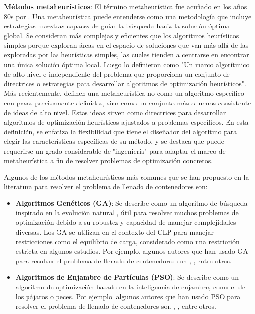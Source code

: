 \documentclass[openany]{article}
\begin{document}
\textbf{Métodos metaheurísticos}: El término metaheurística fue acuñado en los años 80s por \textcite{GLOVER1986533}. Una metaheurística puede entenderse como una metodología que incluye estrategias maestras capaces de guiar la búsqueda hacia la solución óptima global. Se consideran más complejas y eficientes que los algoritmos heurísticos simples porque exploran áreas en el espacio de soluciones que van más allá de las exploradas por las heurísticas simples, las cuales tienden a centrarse en encontrar una única solución óptima local. Luego \textcite{Sorensen2013} lo definieron como "Un marco algorítmico de alto nivel e independiente del problema que proporciona un conjunto de directrices o estrategias para desarrollar algoritmos de optimización heurísticos". Más recientemente, \textcite{MARTI2024} definen una metaheurística no como un algoritmo específico con pasos precisamente definidos, sino como un conjunto más o menos consistente de ideas de alto nivel. Estas ideas sirven como directrices para desarrollar algoritmos de optimización heurísticos ajustados a problemas específicos. En esta definición, se enfatiza la flexibilidad que tiene el diseñador del algoritmo para elegir las características específicas de su método, y se destaca que puede requerirse un grado considerable de "ingeniería" para adaptar el marco de metaheurística a fin de resolver problemas de optimización concretos.

Algunos de los métodos metaheurísticos más comunes que se han propuesto en la literatura para resolver el problema de llenado de contenedores son:

\begin{itemize}
    \item \textbf{Algoritmos Genéticos (GA)}: Se describe como un algoritmo de búsqueda inspirado en la evolución natural \parencite{goldberg2013genetic}, útil para resolver muchos problemas de optimización debido a su robustez y capacidad de manejar complejidades diversas. Los GA se utilizan en el contexto del CLP para manejar restricciones como el equilibrio de carga, considerado como una restricción estricta en algunos estudios. Por ejemplo, algunos autores que han usado GA para resolver el problema de llenado de contenedores son \textcite{RAMOS20181140}, \textcite{GONCALVES2012179}, \textcite{KANG20121287} entre otros.
    \item \textbf{Algoritmos de Enjambre de Partículas (PSO)}: Se describe como un algoritmo de optimización basado en la inteligencia de enjambre, como el de los pájaros o peces. Por ejemplo, algunos autores que han usado PSO para resolver el problema de llenado de contenedores son \textcite{KUO2023110417}, \textcite{domingo2012particle}, \textcite{Cano2010} entre otros.
\end{itemize}
\end{document}
